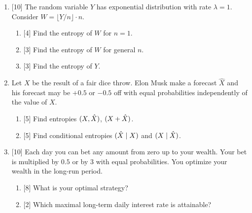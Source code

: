 \documentclass[12pt]{article}
\let\H\relax
\DeclareMathOperator{\H}{\mathbb{H}}
\begin{document}

\begin{enumerate}

\item {[10]} The random variable $Y$ has exponential distribution with rate $\lambda = 1$.
Consider $W = \lfloor Y / n \rfloor \cdot n$.

\begin{enumerate}
    \item {[4]} Find the entropy of $W$ for $n = 1$.
    \item {[3]} Find the entropy of $W$ for general $n$.
    \item {[3]} Find the entropy of $Y$.
\end{enumerate}
    

\item Let $X$ be the result of a fair dice throw. 
Elon Musk make a forecast $\hat X$ and his forecast may be $+0.5$ or $-0.5$ off with equal 
probabilities independently of the value of $X$. 

\begin{enumerate}
    \item {[5]} Find entropies $\H(X, \hat X)$, $\H(X + \hat X)$.
    \item {[5]} Find conditional entropies $\H(\hat X \mid X)$ and $\H(X \mid \hat X)$.
\end{enumerate}

\item {[10]} Each day you can bet any amount from zero up to your wealth.
Your bet is multiplied by $0.5$ or by $3$ with equal probabilities. 
You optimize your wealth in the long-run period. 

\begin{enumerate}
    \item {[8]} What is your optimal strategy?
    \item {[2]} Which maximal long-term daily interest rate is attainable?
\end{enumerate}



\end{enumerate}
\end{document}
